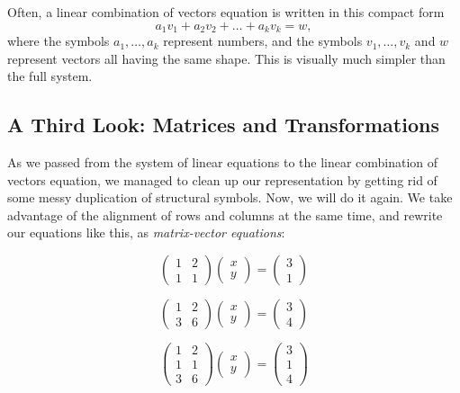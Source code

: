 \documentclass[elementsmain.tex]{subfiles}
\begin{document}
Often, a linear combination of vectors equation is written in this compact form
\[
a_1 v_1 + a_2 v_2 + \dots + a_k v_k = w,
\]
where the symbols $a_1, \ldots, a_k$ represent numbers, and the symbols $v_1, \ldots, v_k$ and $w$ represent vectors all having the same shape. This is visually much simpler than the full system.

\subsection*{A Third Look: Matrices and Transformations} 

As we passed from the system of linear equations to the linear combination of vectors equation, we managed to clean up our representation by getting rid of some messy duplication of structural symbols. Now, we will do it again. We take advantage of the  alignment of rows and columns at the same time, and rewrite our equations like this, as \emph{matrix-vector equations}:

\[\tag{A}
\begin{pmatrix} 1 & 2 \\ 1 & 1 \end{pmatrix} \begin{pmatrix}x \\ y \end{pmatrix} 
=\begin{pmatrix}3 \\ 1 \end{pmatrix}
\]

\[\tag{B}
\begin{pmatrix} 1 & 2 \\ 3 & 6 \end{pmatrix} \begin{pmatrix}x \\ y \end{pmatrix} 
=\begin{pmatrix}3 \\ 4 \end{pmatrix}
\]

\[\tag{C}
\begin{pmatrix} 1 & 2 \\ 1 & 1 \\ 3 & 6 \end{pmatrix} \begin{pmatrix}x \\ y \end{pmatrix} 
=\begin{pmatrix}3 \\ 1 \\ 4 \end{pmatrix}
\]
\end{document}
